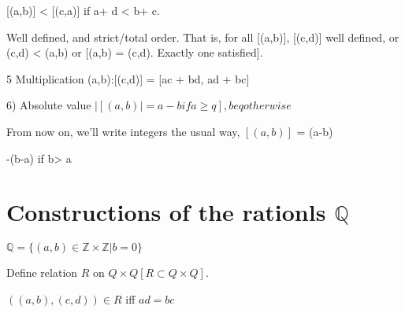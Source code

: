 \documentclass[twoside]{article}
\newcommand{\Z}{\mathbb{Z}}
\newcommand\Q{\mathbb{Q}}
\begin{document}
    [(a,b)] < [(c,a)] if a+ d < b+ c. 

    Well defined, and strict/total order. That is, for all [(a,b)], [(c,d)] well defined, or (c,d) < (a,b) or [(a,b) = (c,d). Exactly one satisfied]. 
    
    
    5 Multiplication (a,b):[(c,d)] = [ac + bd, ad + bc]

    6) Absolute value $\vert [(a,b) \vert = a - b if a \geq q], beq otherwise$

    From now on, we'll write integers the usual way, $[(a,b)]$ = (a-b) 

    -(b-a) if b> a

    \section{Constructions of the rationls $\Q$}

    $\Q = \{(a,b) \in \Z \times \Z \vert b = 0\}$

    Define relation $R$ on $Q \times Q [R \subset Q \times Q]$.

    $((a,b),(c,d)) \in R$ iff $ad = bc$
\end{document}
